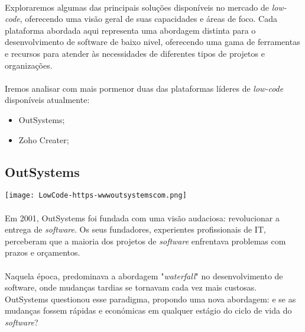 \documentclass[pdflatex,sn-mathphys-num]{sn-jnl}
\theoremstyle{thmstyleone}
\theoremstyle{thmstyletwo}
\theoremstyle{thmstylethree}
\begin{document}
\paragraph{}Exploraremos algumas das principais soluções disponíveis no mercado de \textit{low-code}, oferecendo uma visão geral de suas capacidades e áreas de foco. Cada plataforma abordada aqui representa uma abordagem distinta para o desenvolvimento de software de baixo nivel, oferecendo uma gama de ferramentas e recursos para atender às necessidades de diferentes tipos de projetos e organizações.

\paragraph{}Iremos analisar com mais pormenor duas das plataformas líderes de \textit{low-code} disponíveis atualmente:
\begin{itemize}
    \item OutSystems;
    \item Zoho Creater;
\end{itemize}

\subsection{OutSystems}\label{subsec}
\begin{center}
\texttt{[image: LowCode-https-wwwoutsystemscom.png]}
\end{center}


\paragraph{}Em 2001, OutSystems foi fundada com uma visão audaciosa: revolucionar a entrega de \textit{software}. Os seus fundadores, experientes profissionais de IT, perceberam que a maioria dos projetos de \textit{software} enfrentava problemas com prazos e orçamentos.\cite{bib9}

\paragraph{}Naquela época, predominava a abordagem "\textit{waterfall}"\cite{bib12} no desenvolvimento de software, onde mudanças tardias se tornavam cada vez mais custosas. OutSystems questionou esse paradigma, propondo uma nova abordagem: e se as mudanças fossem rápidas e económicas em qualquer estágio do ciclo de vida do \textit{software}?\cite{bib9}
\end{document}
